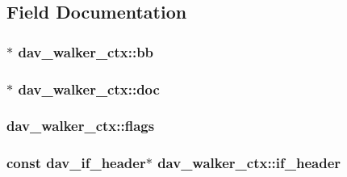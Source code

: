 \subsection{Field Documentation}
\subsubsection[{\texorpdfstring{bb}{bb}}]{$\ast$ dav\+\_\+walker\+\_\+ctx\+::bb}\hypertarget{structdav__walker__ctx_aab3897a11cbab7491982f41884f04887}{}\label{structdav__walker__ctx_aab3897a11cbab7491982f41884f04887}
\subsubsection[{\texorpdfstring{doc}{doc}}]{$\ast$ dav\+\_\+walker\+\_\+ctx\+::doc}\hypertarget{structdav__walker__ctx_abf48f7fa0d795815ffa9e6e21dd5833a}{}\label{structdav__walker__ctx_abf48f7fa0d795815ffa9e6e21dd5833a}
\subsubsection[{\texorpdfstring{flags}{flags}}]{ dav\+\_\+walker\+\_\+ctx\+::flags}\hypertarget{structdav__walker__ctx_a0af5f3818e73f77edc1ea122102ab652}{}\label{structdav__walker__ctx_a0af5f3818e73f77edc1ea122102ab652}
\subsubsection[{\texorpdfstring{if\+\_\+header}{if_header}}]{\setlength{\rightskip}{0pt plus 5cm}const {\bf dav\+\_\+if\+\_\+header}$\ast$ dav\+\_\+walker\+\_\+ctx\+::if\+\_\+header}\hypertarget{structdav__walker__ctx_aa49644d94a98a75b3474a63b7dc2440f}{}\label{structdav__walker__ctx_aa49644d94a98a75b3474a63b7dc2440f}
